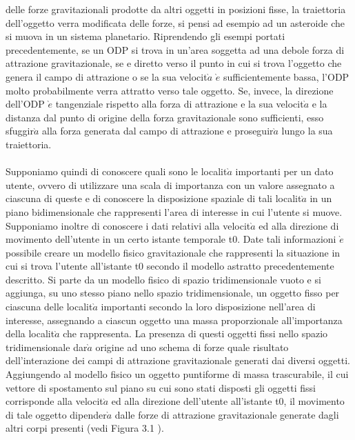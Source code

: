 delle forze gravitazionali prodotte da altri oggetti in posizioni fisse, la
traiettoria dell'oggetto verra modificata delle forze, si pensi ad esempio ad un
asteroide che si muova in un sistema planetario. Riprendendo gli esempi portati
precedentemente, se un ODP si trova in un'area soggetta ad una debole
forza di attrazione gravitazionale, se e diretto verso il punto in cui si trova
l'oggetto che genera il campo di attrazione o se la sua velocit$\grave{a}$ $\grave{e}$ sufficientemente
bassa, l'ODP molto probabilmente verra attratto verso tale oggetto.
Se, invece, la direzione dell'ODP $\grave{e}$ tangenziale rispetto alla forza di attrazione
e la sua velocit$\grave{a}$ e la distanza dal punto di origine della forza gravitazionale
sono sufficienti, esso sfuggir$\grave{a}$ alla forza generata dal campo di attrazione e
proseguir$\grave{a}$ lungo la sua traiettoria.\\
\\
Supponiamo quindi di conoscere quali sono le localit$\grave{a}$ importanti per un
dato utente, ovvero di utilizzare una scala di importanza con un valore assegnato
a ciascuna di queste e di conoscere la disposizione spaziale di tali localit$\grave{a}$
in un piano bidimensionale che rappresenti l'area di interesse in cui l'utente
si muove. Supponiamo inoltre di conoscere i dati relativi alla velocit$\grave{a}$ ed alla
direzione di movimento dell'utente in un certo istante temporale t0. Date tali
informazioni $\grave{e}$ possibile creare un modello fisico gravitazionale che rappresenti
la situazione in cui si trova l'utente all'istante t0 secondo il modello astratto
precedentemente descritto.
Si parte da un modello fisico di spazio tridimensionale vuoto e si aggiunga,
su uno stesso piano nello spazio tridimensionale, un oggetto fisso per ciascuna
delle localit$\grave{a}$ importanti secondo la loro disposizione nell'area di interesse,
assegnando a ciascun oggetto una massa proporzionale all'importanza della
localit$\grave{a}$ che rappresenta. La presenza di questi oggetti fissi nello spazio tridimensionale
dar$\grave{a}$ origine ad uno schema di forze quale risultato dell'interazione
dei campi di attrazione gravitazionale generati dai diversi oggetti. Aggiungendo
al modello fisico un oggetto puntiforme di massa trascurabile, il cui vettore
di spostamento sul piano su cui sono stati disposti gli oggetti fissi corrisponde
alla velocit$\grave{a}$ ed alla direzione dell'utente all'istante t0, il movimento di tale
oggetto dipender$\grave{a}$ dalle forze di attrazione gravitazionale generate dagli altri
corpi presenti (vedi Figura 3.1 ).

